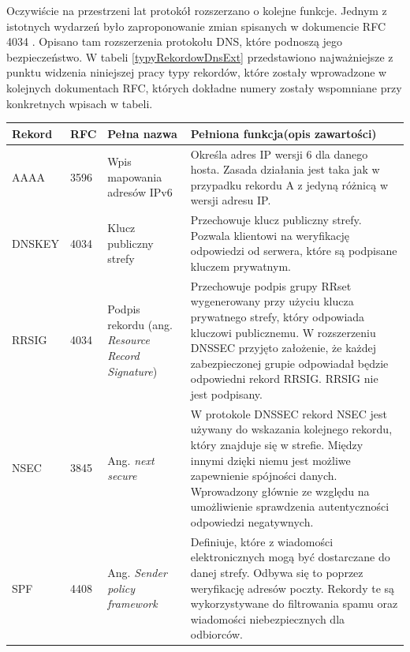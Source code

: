Oczywiście na przestrzeni lat protokół rozszerzano o kolejne funkcje. Jednym z istotnych wydarzeń było zaproponowanie zmian
spisanych w dokumencie RFC 4034 \cite{RFC4034}. Opisano tam rozszerzenia protokołu DNS, które podnoszą jego bezpieczeństwo.
W tabeli \ref{typyRekordowDnsExt} przedstawiono najważniejsze z punktu widzenia niniejszej pracy typy rekordów, które zostały
wprowadzone w kolejnych dokumentach RFC, których dokładne numery zostały wspomniane przy konkretnych wpisach w tabeli.


\begin{longtable}{|l|p{0.7cm}|p{2.5cm}|p{7.5cm}|}
	\hline
	\textbf{Rekord} &
	\textbf{RFC} &
	\textbf{Pełna nazwa} &
	\textbf{Pełniona funkcja(opis zawartości)} \\ \hline\hline
		AAAA & 3596 \cite{RFC3596} &
		Wpis mapowania adresów IPv6 &
		Określa adres IP wersji 6 dla danego hosta. Zasada działania jest taka jak w przypadku rekordu A z jedyną różnicą
		w wersji adresu IP. \\ \hline

		DNSKEY & 4034 \cite{RFC4034} & Klucz publiczny strefy & Przechowuje klucz publiczny strefy. Pozwala klientowi na
		weryfikację odpowiedzi od serwera,
		które są podpisane kluczem prywatnym. \\ \hline

		RRSIG & 4034 \cite{RFC4034} & Podpis rekordu (ang. \textit{Resource Record Signature}) &
		Przechowuje podpis grupy RRset wygenerowany przy użyciu klucza prywatnego strefy, który odpowiada kluczowi publicznemu. W
		rozszerzeniu DNSSEC przyjęto założenie, że każdej zabezpieczonej grupie odpowiadał będzie odpowiedni rekord RRSIG. RRSIG
		nie jest podpisany.\\ \hline

		NSEC & 3845 \cite{RFC3845} & Ang. \textit{next secure} &
		W protokole DNSSEC rekord NSEC jest używany do wskazania kolejnego rekordu, który znajduje się w strefie. Między innymi
		dzięki niemu jest możliwe zapewnienie spójności danych. Wprowadzony głównie ze względu na umożliwienie sprawdzenia
		autentyczności odpowiedzi negatywnych. \\ \hline

		SPF & 4408 \cite{RFC4408} & Ang. \textit{Sender policy framework} & Definiuje, które z wiadomości elektronicznych mogą być
		dostarczane do danej strefy. Odbywa się to poprzez weryfikację adresów poczty. Rekordy te są wykorzystywane do filtrowania
		spamu oraz wiadomości niebezpiecznych dla odbiorców. \\ \hline


\end{longtable}
